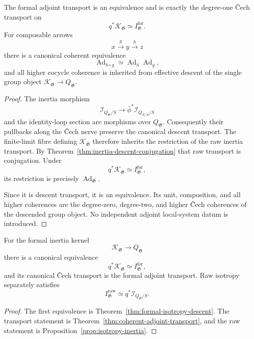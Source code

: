 \begin{theorem}
\label{thm:coherent-adjoint-transport}
The formal adjoint transport is an equivalence and is exactly the degree-one
\v{C}ech transport on
\[
    q^*\mathcal K_{\mathfrak G}
    \simeq
    I^{\mathrm{for}}_{\mathfrak G}.
\]
For composable arrows
\[
    x\xrightarrow{g}y\xrightarrow{h}z
\]
there is a canonical coherent equivalence
\[
    \operatorname{Ad}_{h\circ g}
    \simeq
    \operatorname{Ad}_{h}\operatorname{Ad}_{g},
\]
and all higher cocycle coherence is inherited from effective descent of the
single group object
$\mathcal K_{\mathfrak G}\to Q_{\mathfrak G}$.
\end{theorem}

\begin{proof}
The inertia morphism
\[
    \mathcal I_{Q_{\mathfrak G}/S}
    \longrightarrow
    \bar\phi^*\mathcal I_{Q_{X/S}/S}
\]
and the identity-loop section are morphisms over $Q_{\mathfrak G}$.
Consequently their pullbacks along the \v{C}ech nerve preserve the canonical
descent transport.  The finite-limit fibre defining
$\mathcal K_{\mathfrak G}$ therefore inherits the restriction of the raw
inertia transport.  By
Theorem~\ref{thm:inertia-descent-conjugation} that raw transport is
conjugation.  Under
\[
    q^*\mathcal K_{\mathfrak G}
    \simeq
    I^{\mathrm{for}}_{\mathfrak G},
\]
its restriction is precisely
$\operatorname{Ad}_{\mathfrak G}$.

Since it is descent transport, it is an equivalence.  Its unit, composition,
and all higher coherences are the degree-zero, degree-two, and higher
\v{C}ech coherences of the descended group object.  No independent adjoint
local-system datum is introduced.
\end{proof}

\begin{corollary}
\label{cor:adjoint-inertia-object}
For the formal inertia kernel
\[
    \mathcal K_{\mathfrak G}\longrightarrow Q_{\mathfrak G}
\]
there is a canonical equivalence
\[
    q^*\mathcal K_{\mathfrak G}
    \simeq
    I^{\mathrm{for}}_{\mathfrak G},
\]
and its canonical \v{C}ech transport is the formal adjoint transport.  Raw
isotropy separately satisfies
\[
    I^{\mathrm{raw}}_{\mathfrak G}
    \simeq
    q^*\mathcal I_{Q_{\mathfrak G}/S}.
\]
\end{corollary}

\begin{proof}
The first equivalence is
Theorem~\ref{thm:formal-isotropy-descent}.  The transport statement is
Theorem~\ref{thm:coherent-adjoint-transport}, and the raw statement is
Proposition~\ref{prop:isotropy-inertia}.
\end{proof}

